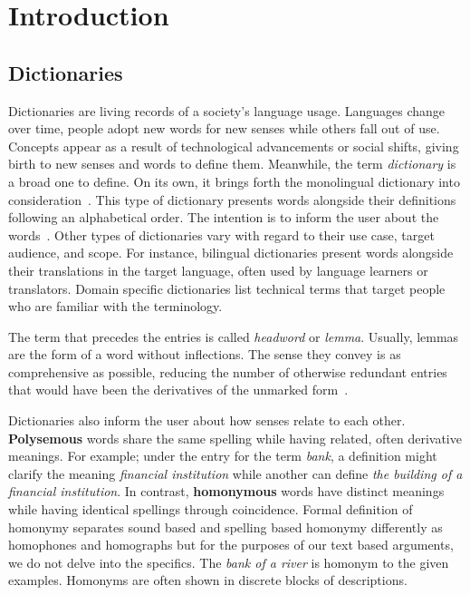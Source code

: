 \chapter{Introduction}\label{chap:introduction}%
\section{Dictionaries}%
\label{sec:dictionaries}

Dictionaries are living records of a society's language usage.
Languages change over time, people adopt new words for new senses while others fall out of use.
Concepts appear as a result of technological advancements or social shifts, giving birth to new senses and words to define them.
Meanwhile, the term \emph{dictionary} is a broad one to define.
On its own, it brings forth the monolingual dictionary into consideration~\cite{sterkenburg_practical_2003}.
This type of dictionary presents words alongside their definitions following an alphabetical order.
The intention is to inform the user about the words~\cite{uzun_modern_2005}.
Other types of dictionaries vary with regard to their use case, target audience, and scope.
For instance, bilingual dictionaries present words alongside their translations in the target language, often used by language learners or translators.
Domain specific dictionaries list technical terms that target people who are familiar with the terminology.

The term that precedes the entries is called \emph{headword} or \emph{lemma}.
Usually, lemmas are the form of a word without inflections.
The sense they convey is as comprehensive as possible, reducing the number of otherwise redundant entries that would have been the derivatives of the unmarked form~\cite{ibrahim_usta_turkce_2006}.

Dictionaries also inform the user about how senses relate to each other.
\textbf{Polysemous} words share the same spelling while having related, often derivative meanings.
For example; under the entry for the term \emph{bank}, a definition might clarify the meaning \emph{financial institution} while another can define \emph{the building of a financial institution}.
In contrast, \textbf{homonymous} words have distinct meanings while having identical spellings through coincidence.
Formal definition of homonymy separates sound based and spelling based homonymy differently as homophones and homographs but for the purposes of our text based arguments, we do not delve into the specifics.
The \emph{bank of a river} is homonym to the given examples.
Homonyms are often shown in discrete blocks of descriptions.

